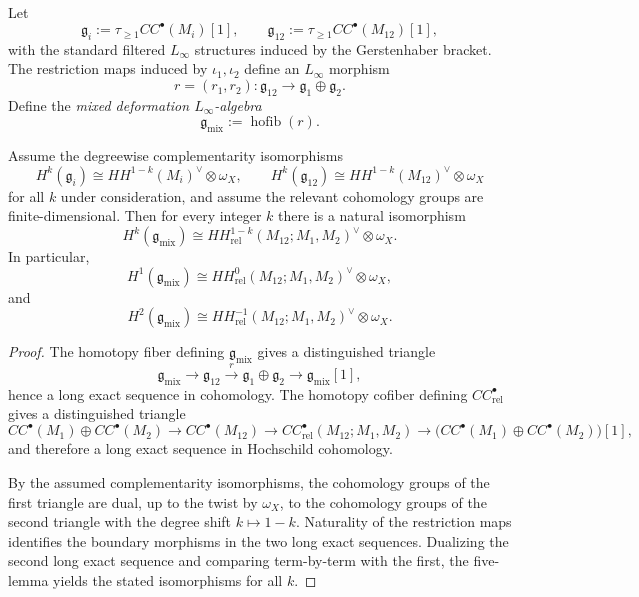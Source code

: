 \begin{definition}
Let
\[
\mathfrak g_i:=\tau_{\ge 1}CC^\bullet(M_i)[1],
\qquad
\mathfrak g_{12}:=\tau_{\ge 1}CC^\bullet(M_{12})[1],
\]
with the standard filtered $L_\infty$ structures induced by the Gerstenhaber bracket. The restriction maps induced by $\iota_1,\iota_2$ define an $L_\infty$ morphism
\[
r=(r_1,r_2):\mathfrak g_{12}\to \mathfrak g_1\oplus \mathfrak g_2.
\]
Define the \emph{mixed deformation $L_\infty$-algebra}
\[
\mathfrak g_{\mathrm{mix}}:=\operatorname{hofib}(r).
\]
\end{definition}

\begin{theorem}
Assume the degreewise complementarity isomorphisms
\[
H^k(\mathfrak g_i)
\cong
HH^{1-k}(M_i)^\vee\otimes \omega_X,
\qquad
H^k(\mathfrak g_{12})
\cong
HH^{1-k}(M_{12})^\vee\otimes \omega_X
\]
for all $k$ under consideration, and assume the relevant cohomology groups are finite-dimensional. Then for every integer $k$ there is a natural isomorphism
\[
H^k(\mathfrak g_{\mathrm{mix}})
\cong
HH^{1-k}_{\mathrm{rel}}(M_{12};M_1,M_2)^\vee\otimes \omega_X.
\]
In particular,
\[
H^1(\mathfrak g_{\mathrm{mix}})
\cong
HH^{0}_{\mathrm{rel}}(M_{12};M_1,M_2)^\vee\otimes \omega_X,
\]
and
\[
H^2(\mathfrak g_{\mathrm{mix}})
\cong
HH^{-1}_{\mathrm{rel}}(M_{12};M_1,M_2)^\vee\otimes \omega_X.
\]
\end{theorem}

\begin{proof}
The homotopy fiber defining $\mathfrak g_{\mathrm{mix}}$ gives a distinguished triangle
\[
\mathfrak g_{\mathrm{mix}} \to \mathfrak g_{12} \xrightarrow{r} \mathfrak g_1\oplus \mathfrak g_2 \to \mathfrak g_{\mathrm{mix}}[1],
\]
hence a long exact sequence in cohomology. The homotopy cofiber defining $CC^\bullet_{\mathrm{rel}}$ gives a distinguished triangle
\[
CC^\bullet(M_1)\oplus CC^\bullet(M_2)
\to CC^\bullet(M_{12})
\to CC^\bullet_{\mathrm{rel}}(M_{12};M_1,M_2)
\to
\big(CC^\bullet(M_1)\oplus CC^\bullet(M_2)\big)[1],
\]
and therefore a long exact sequence in Hochschild cohomology.

By the assumed complementarity isomorphisms, the cohomology groups of the first triangle are dual, up to the twist by $\omega_X$, to the cohomology groups of the second triangle with the degree shift $k\mapsto 1-k$. Naturality of the restriction maps identifies the boundary morphisms in the two long exact sequences. Dualizing the second long exact sequence and comparing term-by-term with the first, the five-lemma yields the stated isomorphisms for all $k$.
\end{proof}

